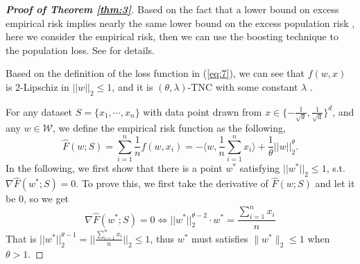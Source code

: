 \documentclass[12pt]{alt2022} %
\begin{document}
		\begin{proof}[{\bf Proof of Theorem \ref{thm:3}}]
		
		Based on the fact that a lower bound on excess empirical risk implies nearly the same lower bound on the excess population risk \citep{bassily2019private}, here we consider the empirical risk, then we can use the boosting technique to the population loss. See \citep{bassily2019private} for details. 
		

  Based on the definition of the loss function in (\ref{eq:7}), we can see that $f(w,x)$ is 2-Lipschiz in $||w||_2 \leq 1$, and it is $(\theta, \lambda)$-TNC with some constant $\lambda$ \citep{sridharan2010convex}. 
	
	For any dataset $S=\{x_1,\cdots,x_n\}$ with data point drawn from $x\in\{-\frac{1}{\sqrt{d}},\frac{1}{\sqrt{d}}\}^d$, and any $w\in \mathcal{W}$,
	we define the empirical risk function as the following, 
	\begin{equation*}
	\hat{F}(w;S)=\sum\limits_{i=1}^{n}\frac{1}{n}f(w,x_i)=-\langle w, \frac{1}{n}\sum\limits_{i=1}^{n} x_i \rangle +\frac{1}{\theta}||w||_2^{\theta}. 
	\end{equation*} 
		In the following, we first show that there is a point $w^{*}$ satisfying $ ||w^*||_2\leq 1$, s.t. $\nabla \hat{F}(w^*;S)=0$. To prove this, we first 
		take the derivative of $\hat{F}(w; S)$ and let it be $0$, so we get
			\begin{equation}\label{eq18}
		\nabla \hat{F}(w^*; S)=0\Leftrightarrow  ||w^*||_2^{\theta-2}\cdot w^*=\frac{\sum_{i=1}^{n}x_i}{n}
		\end{equation}
		That is $||w^*||_2^{\theta-1}=||\frac{\sum_{i=1}^{n}x_i}{ n}||_2\leq 1$, thus $w^*$ must satisfies $\|w^*\|_2\leq 1$ when $\theta>1$.
		

\end{proof}
\end{document}
